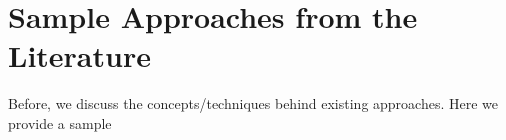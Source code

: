\section{Sample Approaches from the Literature}
Before, we discuss the concepts/techniques behind existing approaches. Here we provide a sample  
